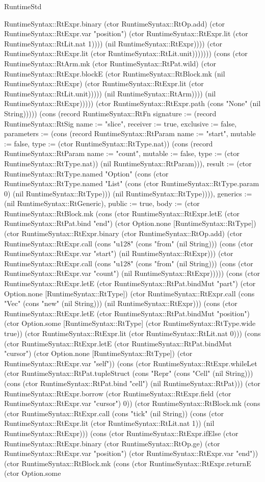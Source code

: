\begin{lexlean}{RuntimeStd}
\begin{semanticmodule}
{RuntimeSyntax::RtExpr.binary (ctor RuntimeSyntax::RtOp.add) (ctor RuntimeSyntax::RtExpr.var "position") (ctor RuntimeSyntax::RtExpr.lit (ctor RuntimeSyntax::RtLit.nat 1)))) (nil RuntimeSyntax::RtExpr)))) (ctor RuntimeSyntax::RtExpr.lit (ctor RuntimeSyntax::RtLit.unit))))))) (cons (ctor RuntimeSyntax::RtArm.mk (ctor RuntimeSyntax::RtPat.wild) (ctor RuntimeSyntax::RtExpr.blockE (ctor RuntimeSyntax::RtBlock.mk (nil RuntimeSyntax::RtExpr) (ctor RuntimeSyntax::RtExpr.lit (ctor RuntimeSyntax::RtLit.unit))))) (nil RuntimeSyntax::RtArm)))) (nil RuntimeSyntax::RtExpr))))) (ctor RuntimeSyntax::RtExpr.path (cons "None" (nil String))))}) (cons (record RuntimeSyntax::RtFn {signature := (record RuntimeSyntax::RtSig {name := "slice", receiver := true, exclusive := false, parameters := (cons (record RuntimeSyntax::RtParam {name := "start", mutable := false, type := (ctor RuntimeSyntax::RtType.nat)}) (cons (record RuntimeSyntax::RtParam {name := "count", mutable := false, type := (ctor RuntimeSyntax::RtType.nat)}) (nil RuntimeSyntax::RtParam))), result := (ctor RuntimeSyntax::RtType.named "Option" (cons (ctor RuntimeSyntax::RtType.named "List" (cons (ctor RuntimeSyntax::RtType.param 0) (nil RuntimeSyntax::RtType))) (nil RuntimeSyntax::RtType)))}), generics := (nil RuntimeSyntax::RtGeneric), public := true, body := (ctor RuntimeSyntax::RtBlock.mk (cons (ctor RuntimeSyntax::RtExpr.letE (ctor RuntimeSyntax::RtPat.bind "end") (ctor Option.none [RuntimeSyntax::RtType]) (ctor RuntimeSyntax::RtExpr.binary (ctor RuntimeSyntax::RtOp.add) (ctor RuntimeSyntax::RtExpr.call (cons "u128" (cons "from" (nil String))) (cons (ctor RuntimeSyntax::RtExpr.var "start") (nil RuntimeSyntax::RtExpr))) (ctor RuntimeSyntax::RtExpr.call (cons "u128" (cons "from" (nil String))) (cons (ctor RuntimeSyntax::RtExpr.var "count") (nil RuntimeSyntax::RtExpr))))) (cons (ctor RuntimeSyntax::RtExpr.letE (ctor RuntimeSyntax::RtPat.bindMut "part") (ctor Option.none [RuntimeSyntax::RtType]) (ctor RuntimeSyntax::RtExpr.call (cons "Vec" (cons "new" (nil String))) (nil RuntimeSyntax::RtExpr))) (cons (ctor RuntimeSyntax::RtExpr.letE (ctor RuntimeSyntax::RtPat.bindMut "position") (ctor Option.some [RuntimeSyntax::RtType] (ctor RuntimeSyntax::RtType.wide true)) (ctor RuntimeSyntax::RtExpr.lit (ctor RuntimeSyntax::RtLit.nat 0))) (cons (ctor RuntimeSyntax::RtExpr.letE (ctor RuntimeSyntax::RtPat.bindMut "cursor") (ctor Option.none [RuntimeSyntax::RtType]) (ctor RuntimeSyntax::RtExpr.var "self")) (cons (ctor RuntimeSyntax::RtExpr.whileLet (ctor RuntimeSyntax::RtPat.tupleStruct (cons "Repr" (cons "Cell" (nil String))) (cons (ctor RuntimeSyntax::RtPat.bind "cell") (nil RuntimeSyntax::RtPat))) (ctor RuntimeSyntax::RtExpr.borrow (ctor RuntimeSyntax::RtExpr.field (ctor RuntimeSyntax::RtExpr.var "cursor") 0)) (ctor RuntimeSyntax::RtBlock.mk (cons (ctor RuntimeSyntax::RtExpr.call (cons "tick" (nil String)) (cons (ctor RuntimeSyntax::RtExpr.lit (ctor RuntimeSyntax::RtLit.nat 1)) (nil RuntimeSyntax::RtExpr))) (cons (ctor RuntimeSyntax::RtExpr.ifElse (ctor RuntimeSyntax::RtExpr.binary (ctor RuntimeSyntax::RtOp.ge) (ctor RuntimeSyntax::RtExpr.var "position") (ctor RuntimeSyntax::RtExpr.var "end")) (ctor RuntimeSyntax::RtBlock.mk (cons (ctor RuntimeSyntax::RtExpr.returnE (ctor Option.some }
\end{semanticmodule}
\end{lexlean}
